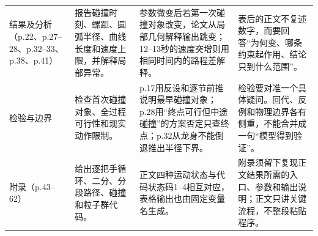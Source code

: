 \begin{longtable}{p{2.25cm}p{4.0cm}p{5.1cm}p{4.2cm}}
结果及分析（p.22、p.27--28、p.32--33、p.38、p.41）
& 报告碰撞时刻、螺距、圆弧半径、曲线长度和速度上限，并解释局部异常。
& 参数微变后若第一次碰撞对象改变，论文从局部几何解释输出跳变；12--13秒的速度突增则用相同时间内的路程差解释。
& 表后的正文不复述数字，而要回答“为何变、哪条约束起作用、结论只到什么范围”。\\

检验与边界
& 检查首次碰撞对象、全过程可行性和现实动作限制。
& p.17用反设和逐节前推说明最早碰撞对象；p.28用“终点可行但中途碰撞”的方案否定只查终点；p.32从龙身不能倒退推出半径下界。
& 检验要对准一个具体疑问。回代、反例和物理边界各有侧重，不能合并成一句“模型得到验证”。\\

附录（p.43--62）
& 给出逐把手循环、二分、分段路径、碰撞和粒子群代码。
& 正文四种运动状态与代码状态码1--4相互对应，表格输出也由固定变量名生成。
& 附录须留下复现正文结果所需的入口、参数和输出说明；正文只讲关键流程，不整段粘贴程序。\\
\end{longtable}
\normalsize

